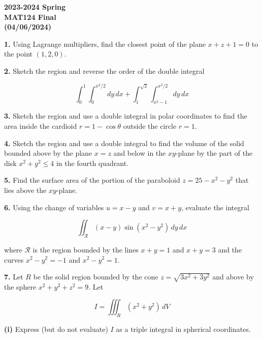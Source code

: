 \documentclass{article}
\begin{document}
\pagestyle{empty}
\large

\begin{center}
\textbf{2023-2024 Spring \\MAT124 Final\\(04/06/2024)}
\end{center}

\textbf{1.} Using Lagrange multipliers, find the closest point of the plane $x+z+1=0$ to the point $(1,2,0)$.

\vspace{1em}

\textbf{2.} Sketch the region and reverse the order of the double integral

\[
\int_0^1
\int_0^{x^2/2}dy\,dx+\int_1^{\sqrt2}\int_{x^2-1}^{x^2/2}dy\,dx\]

\vspace{1em}

\textbf{3.} Sketch the region and use a double integral in polar coordinates to find the area inside the cardioid $r=1-\cos\theta$ outside the circle $r=1$.

\vspace{1em}

\textbf{4.} Sketch the region and use a double integral to find the volume of the solid bounded above by the plane $x=z$ and below in the $xy$-plane by the part of the disk $x^2+y^2\leq4$ in the fourth quadrant.

\vspace{1em}

\textbf{5.} Find the surface area of the portion of the paraboloid $z=25-x^2-y^2$ that lies above the $xy$-plane.

\vspace{1em}

\textbf{6.} Using the change of variables $u=x-y$ and $v=x+y$, evaluate the integral

\[\iint_{\mathcal{R}}(x-y)\sin\left(x^2-y^2\right)\,dy\,dx\]

where $\mathcal{R}$ is the region bounded by the lines $x+y=1$ and $x+y=3$ and the curves $x^2-y^2=-1$ and $x^2-y^2=1$.

\vspace{1em}

\textbf{7.} Let $R$ be the solid region bounded by the cone $z=\sqrt{3x^2+3y^2}$ and above by the sphere $x^2+y^2+z^2=9$. Let

\[{I}=\iiint_R\left(x^2+y^2\right)\,dV\]

\textbf{(i)} Express (but do not evaluate) ${I}$ as a triple integral in spherical coordinates.
\end{document}
